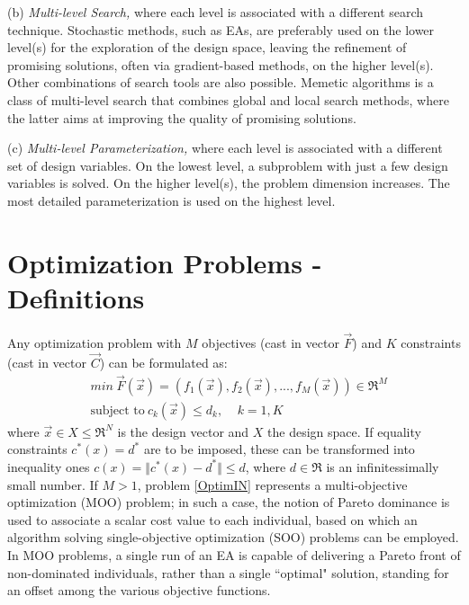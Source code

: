 (b) \emph{Multi-level Search,} where each level is associated with a
different search technique. Stochastic methods, such as EAs, are
preferably used on the lower level(s) for the exploration of the
design space, leaving the refinement of promising solutions, often via gradient-based methods, on the higher level(s). Other
combinations of search tools are also possible. Memetic algorithms \cite{Krans2005,Ong2004,Ong2006,LTT_2_043,LTT_2_053,LTT_4_04} is a class of multi-level search that combines global and local search methods, where the latter aims at improving the quality of
promising solutions.


(c) \emph{Multi-level Parameterization,} where each level is
associated with a different set of design variables. On the lowest
level, a subproblem with just a few design variables is solved. On
the higher level(s), the problem dimension increases. The most detailed parameterization is used on the highest level.



\section{Optimization Problems - Definitions}
\label{OPt_def}
Any optimization problem with $M$ objectives (cast in vector $\vec{F}$) and $K$ constraints (cast in vector $\vec{C}$) can be formulated as:
\begin{align} 
   &min ~ \vec{F}(\vec{x})=(f_1(\vec{x}),f_2(\vec{x}),...,f_M(\vec{x}))\in \Re^{M} \nonumber \\
   &\mbox{subject to} ~ c_k(\vec{x})\leq d_k, ~~~~~ k =1,K
\label{OptimIN}
\end{align}
where $\vec{x}\in X \!\leq\! \Re^{N}$ is the design vector and $X$ the design space. If equality constraints $ c^*(x)=d^* $ are to be imposed, these can be transformed into inequality ones $ c(x)=\Vert c^*(x)-d^*\Vert \leq d $, where $ d \in \Re $ is an infinitessimally small number. If $M \!> \!1$, problem \ref{OptimIN} represents a multi-objective optimization (MOO) problem; in such a case, the notion of Pareto dominance \cite{Zitzler2000} is used to associate a scalar cost value to each individual, based on which an algorithm solving single-objective optimization (SOO) problems can be employed. In MOO problems, a single run of an EA is capable of delivering a Pareto front of non-dominated individuals, rather than a single ``optimal" solution, standing for an offset among the various objective functions. 

